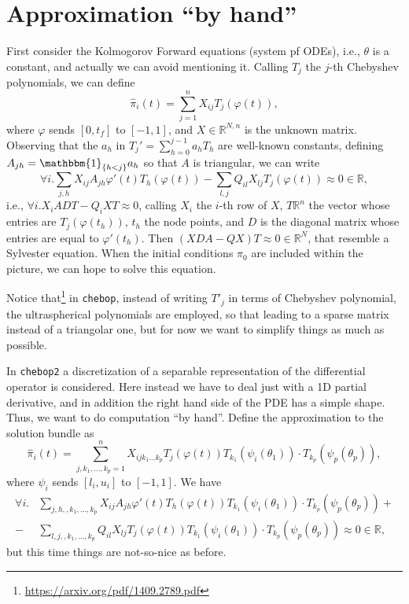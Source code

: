 \documentclass[]{article}
\begin{document}
\section{Approximation ``by hand''}
First consider the Kolmogorov Forward equations (system pf ODEs), i.e.,
$\theta$ is a constant, and actually we can avoid mentioning it.
Calling $T_j$ the $j$-th Chebyshev polynomials, we can define
\begin{equation}
\label{eq:hatpi1d}
\hat{\pi}_i(t) = \sum_{j=1}^n X_{ij}T_j(\varphi(t)),
\end{equation}
where $\varphi$ sends $[0,t_f]$ to $[-1,1]$, and $X\in\mathbb R^{N,n}$ is the
unknown matrix.
Observing that the $a_h$ in $T_j'=\sum_{h=0}^{j-1}a_hT_h$ are well-known constants,
defining $A_{jh}=\mathbbm{1}_{\{h<j\}}a_h$ so that $A$ is triangular, we can write
\[
\forall i. \sum_{j,h}X_{ij}A_{jh}\varphi'(t)T_h(\varphi(t))
-\sum_{l,j}Q_{il}X_{lj}T_j(\varphi(t))\approx 0\in\mathbb R,
\] 
i.e., $\forall i.X_iADT-Q_iXT\approx 0$, calling $X_i$ the $i$-th row of $X$,
$T\mathbb R^{n}$ the vector whose entries are $T_j(\varphi(t_h))$,
$t_h$ the node points, and $D$ is the diagonal matrix whose entries are
equal to $\varphi'(t_h)$. 
Then $(XDA-QX)T\approx 0\in\mathbb R^N$, that resemble a Sylvester equation.
When the initial conditions $\pi_0$ are included within the picture,
we can hope to solve this equation. 

Notice that\footnote{\url{https://arxiv.org/pdf/1409.2789.pdf}} 
in \texttt{chebop}, instead of writing $T'_j$ in terms of Chebyshev polynomial, 
the ultraspherical polynomials are employed, so that leading to a sparse matrix
instead of a triangolar one, but for now we want to simplify things as much as possible.

In \texttt{chebop2} a discretization of a separable representation of the
differential operator is considered. Here instead we have to deal just with a
1D partial derivative, and in addition the right hand side of the PDE has
a simple shape. Thus, we want to do computation ``by hand''.
Define the approximation to the solution bundle as
\begin{equation}
\label{eq:hatpi}
\hat{\pi}_i(t) = \sum_{j,k_1,\dots,k_p=1}^n 
X_{ijk_1\dots k_p}T_j(\varphi(t))
T_{k_1}(\psi_i(\theta_1))\cdot T_{k_p}(\psi_p(\theta_p)),
\end{equation}
where $\psi_i$ sends $[l_i,u_i]$ to $[-1,1]$. We have
\begin{align*}
\forall i. &\sum_{j,h,,k_1,\dots,k_p}X_{ij}A_{jh}\varphi'(t)T_h(\varphi(t))
T_{k_1}(\psi_i(\theta_1))\cdot T_{k_p}(\psi_p(\theta_p))+\\
-&\sum_{l,j,,k_1,\dots,k_p}Q_{il}X_{lj}T_j(\varphi(t))T_{k_1}(\psi_i(\theta_1))\cdot T_{k_p}(\psi_p(\theta_p))
\approx 0\in\mathbb R,
\end{align*}
but this time things are not-so-nice as before.
\end{document}
